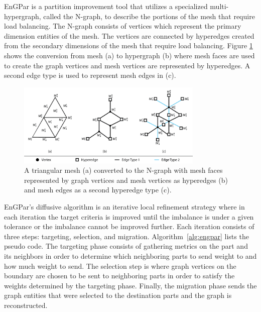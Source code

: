 \documentclass[graybox]{svmult}
\begin{document}

EnGPar is a partition improvement tool that utilizes a specialized multi-hypergraph,
called the N-graph, to describe the portions of the mesh that require load balancing.
The N-graph consists of vertices which represent the primary dimension entities of the
mesh. The vertices are connected by hyperedges created from the secondary dimensions of
the mesh that require load balancing. Figure \ref{fig:ngraph} shows the conversion from
mesh (a) to hypergraph (b) where mesh faces are used to create the graph vertices and
mesh vertices are represented by hyperedges. A second edge type is used to represent mesh edges in (c). 

\begin{figure}[!ht]
  \centering
  \includegraphics[width=3.5in]{images/exampleMesh2Graph.png}
  \caption{A triangular mesh (a) converted to the N-graph with mesh faces represented by graph vertices and mesh vertices as hyperedges (b) and mesh edges as a second hyperedge type (c).}
  \label{fig:ngraph}
\end{figure}

EnGPar's diffusive algorithm is an iterative local refinement strategy where in each
iteration the target criteria is improved until the imbalance is under a given
tolerance or the imbalance cannot be improved further. Each iteration consists of three
steps: targeting, selection, and migration.
Algorithm~\ref{alg:engpar} lists the pseudo code.
The targeting phase consists of gathering
metrics on the part and its neighbors in order to determine which neighboring parts to
send weight to and how much weight to send. The selection step is where graph vertices
on the boundary are chosen to be sent to neighboring parts in order to satisfy the
weights determined by the targeting phase. Finally, the migration phase sends the graph
entities that were selected to the destination parts and the graph is reconstructed.
\end{document}
